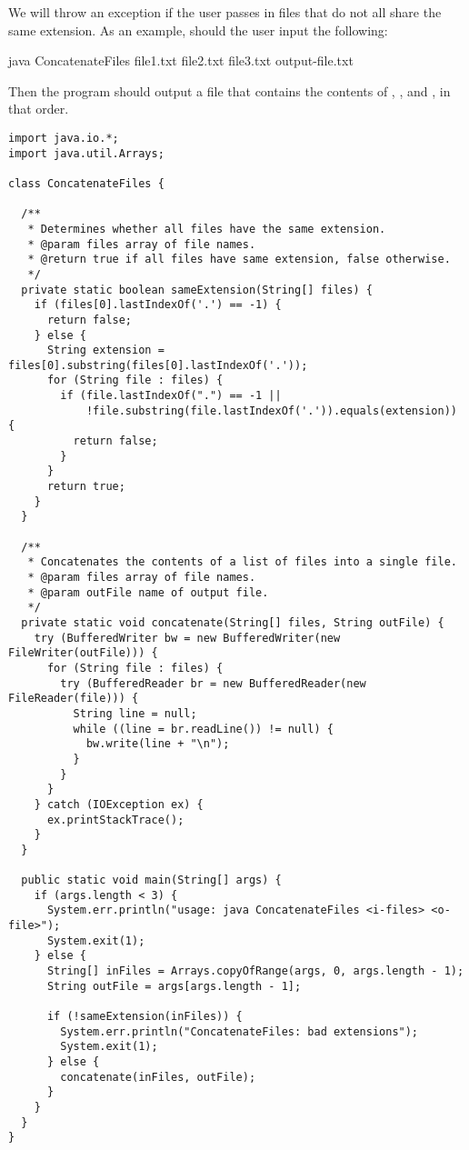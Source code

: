 We will throw an exception if the user passes in files that do not all share the same extension. As an example, should the user input the following:

\begin{verbnobox}[\small]
java ConcatenateFiles file1.txt file2.txt file3.txt output-file.txt
\end{verbnobox}

Then the program should output a file  that contains the contents of , , and , in that order. 

\newpage %
\enlargethispage{3\baselineskip}
\begin{lstlisting}[language=MyJava]
import java.io.*;
import java.util.Arrays;

class ConcatenateFiles {
 
  /**
   * Determines whether all files have the same extension.
   * @param files array of file names.
   * @return true if all files have same extension, false otherwise.
   */
  private static boolean sameExtension(String[] files) {
    if (files[0].lastIndexOf('.') == -1) { 
      return false; 
    } else {
      String extension = files[0].substring(files[0].lastIndexOf('.'));
      for (String file : files) {
        if (file.lastIndexOf(".") == -1 || 
            !file.substring(file.lastIndexOf('.')).equals(extension)) { 
          return false; 
        }
      }
      return true;
    }
  }

  /**
   * Concatenates the contents of a list of files into a single file.
   * @param files array of file names.
   * @param outFile name of output file.
   */
  private static void concatenate(String[] files, String outFile) {
    try (BufferedWriter bw = new BufferedWriter(new FileWriter(outFile))) {
      for (String file : files) {
        try (BufferedReader br = new BufferedReader(new FileReader(file))) {
          String line = null;
          while ((line = br.readLine()) != null) { 
            bw.write(line + "\n"); 
          }
        }
      }
    } catch (IOException ex) { 
      ex.printStackTrace(); 
    }
  }

  public static void main(String[] args) {
    if (args.length < 3) {
      System.err.println("usage: java ConcatenateFiles <i-files> <o-file>");
      System.exit(1);
    } else {
      String[] inFiles = Arrays.copyOfRange(args, 0, args.length - 1);
      String outFile = args[args.length - 1];

      if (!sameExtension(inFiles)) {
        System.err.println("ConcatenateFiles: bad extensions");
        System.exit(1);
      } else {
        concatenate(inFiles, outFile);
      }
    }
  }
}
\end{lstlisting}


